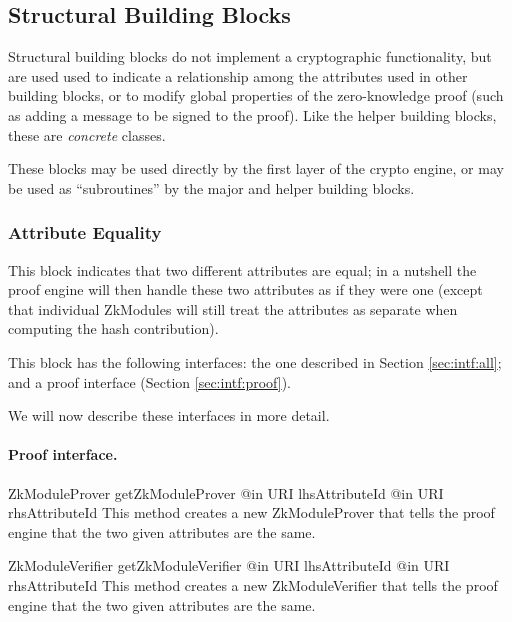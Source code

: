 
  \subsection{Structural Building Blocks}
  \label{sec:blocks:structural}
  Structural building blocks do not implement a cryptographic
  functionality, but are used used to indicate a relationship among
  the attributes used in other building blocks, or to modify global
  properties of the zero-knowledge proof (such as adding a message to
  be signed to the proof). Like the helper building blocks, these
  are \emph{concrete} classes.

  These blocks may be used directly by the first layer of the crypto
  engine, or may be used as ``subroutines'' by the major and helper building blocks.

    \subsubsection{Attribute Equality}

    This block indicates that two different attributes are equal; in
    a nutshell the proof engine will then handle these two attributes as if they were one
    (except that individual ZkModules will still treat the attributes as separate
    when computing the hash contribution).

    This block has the following interfaces:
    the one described in Section \ref{sec:intf:all};
    and a proof interface (Section \ref{sec:intf:proof}).

    We will now describe these interfaces in more detail.

    \paragraph{Proof interface.}
      \begin{method}
      {ZkModuleProver}
      {getZkModuleProver}
      {
        {@in URI lhsAttributeId}
        {@in URI rhsAttributeId}
      }
      This method creates a new ZkModuleProver that tells the proof engine that
      the two given attributes are the same.
      \end{method}
      \begin{method}
      {ZkModuleVerifier}
      {getZkModuleVerifier}
      {
        {@in URI lhsAttributeId}
        {@in URI rhsAttributeId}
      }
      This method creates a new ZkModuleVerifier that tells the proof engine that
      the two given attributes are the same.
      \end{method}

